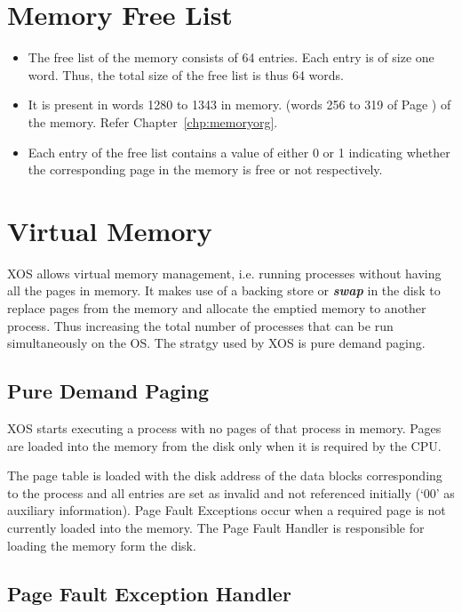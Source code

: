 \documentclass[10pt]{report}
\begin{document}
\section{Memory Free List}
\label{lbl:memlst}

\begin{itemize}
	\item The free list of the memory consists of 64 entries. Each entry is of size one word. Thus, the total size of the free list is thus 64 words.
	\item It is present in words 1280 to 1343 in memory. (words 256 to 319 of Page )
	of the memory. Refer Chapter~\ref{chp:memoryorg}.
	\item Each entry of the free list contains a value of either 0 or 1 indicating whether the corresponding page in the memory is free or not respectively.
\end{itemize}

\section{Virtual Memory}

XOS allows virtual memory management, i.e. running processes without having all the pages in memory. It makes use of a backing store or \textbf{\textit{swap}} in the disk to replace pages from the memory and allocate the emptied memory to another process. Thus increasing the total number of processes that can be run simultaneously on the OS. The stratgy used by XOS is pure demand paging.

\subsection{Pure Demand Paging}
XOS starts executing a process with no pages of that process in memory. Pages are loaded into the memory from the disk only when it is required by the CPU.

 The page table is loaded with the disk address of the data blocks corresponding to the process and all entries are set as invalid and not referenced initially (`00' as auxiliary information). Page Fault Exceptions occur when a required page is not currently loaded into the memory. The Page Fault Handler is responsible for loading the memory form the disk.


\subsection{Page Fault Exception Handler}
\end{document}

